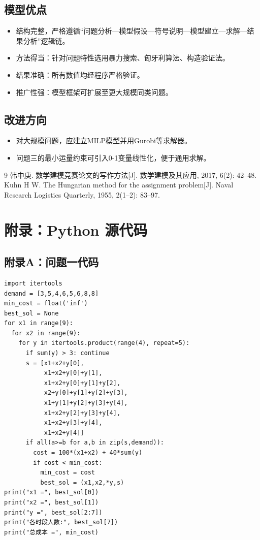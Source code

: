 \documentclass[12pt]{ctexart}
\begin{document}
\subsection{模型优点}
\begin{itemize}
    \item 结构完整，严格遵循“问题分析—模型假设—符号说明—模型建立—求解—结果分析”逻辑链。
    \item 方法得当：针对问题特性选用暴力搜索、匈牙利算法、构造验证法。
    \item 结果准确：所有数值均经程序严格验证。
    \item 推广性强：模型框架可扩展至更大规模同类问题。
\end{itemize}

\subsection{改进方向}
\begin{itemize}
    \item 对大规模问题，应建立MILP模型并用Gurobi等求解器。
    \item 问题三的最小运量约束可引入0-1变量线性化，便于通用求解。
\end{itemize}


\begin{thebibliography}{9}
 韩中庚. 数学建模竞赛论文的写作方法[J]. 数学建模及其应用, 2017, 6(2): 42–48.
 Kuhn H W. The Hungarian method for the assignment problem[J]. Naval Research Logistics Quarterly, 1955, 2(1–2): 83–97.
\end{thebibliography}

\appendix
\section{附录：Python 源代码}

\subsection{附录A：问题一代码}
\begin{verbatim}
import itertools
demand = [3,5,4,6,5,6,8,8]
min_cost = float('inf')
best_sol = None
for x1 in range(9):
  for x2 in range(9):
    for y in itertools.product(range(4), repeat=5):
      if sum(y) > 3: continue
      s = [x1+x2+y[0],
           x1+x2+y[0]+y[1],
           x1+x2+y[0]+y[1]+y[2],
           x2+y[0]+y[1]+y[2]+y[3],
           x1+y[1]+y[2]+y[3]+y[4],
           x1+x2+y[2]+y[3]+y[4],
           x1+x2+y[3]+y[4],
           x1+x2+y[4]]
      if all(a>=b for a,b in zip(s,demand)):
        cost = 100*(x1+x2) + 40*sum(y)
        if cost < min_cost:
          min_cost = cost
          best_sol = (x1,x2,*y,s)
print("x1 =", best_sol[0])
print("x2 =", best_sol[1])
print("y =", best_sol[2:7])
print("各时段人数:", best_sol[7])
print("总成本 =", min_cost)
\end{verbatim}
\end{document}
